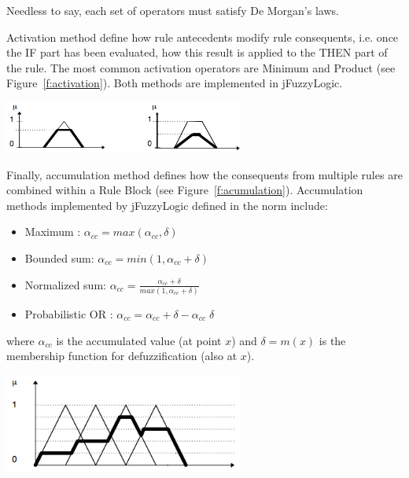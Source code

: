 \documentclass[11pt,twoside]{article}
\begin{document}
\begin{multicols}{2}
Needless to say, each set of operators must satisfy De Morgan’s laws.

Activation method define how rule antecedents modify rule consequents, i.e. once the IF part has been evaluated, how this result is applied to the THEN part of the rule.  
The most common activation operators are Minimum and Product (see Figure~\ref{f:activation}).
Both methods are implemented in jFuzzyLogic.

\vspace*{10pt}
\centerline{\includegraphics[width=3.1in]{./figs/MaxProd.png}}
\vspace*{10pt}
\label{f:activation}
\vspace*{10pt}

Finally, accumulation method defines how the consequents from multiple rules are combined within a Rule Block (see Figure~\ref{f:acumulation}).
Accumulation methods implemented by jFuzzyLogic defined in the norm include: 

\begin{itemize}
	\item Maximum : $\alpha_{cc} = max(\alpha_{cc}, \delta)$
	\item Bounded sum: $\alpha_{cc} = min(1, \alpha_{cc} + \delta)$
	\item Normalized sum: $\alpha_{cc} = \frac{\alpha_{cc} + \delta}{max(1, \alpha_{cc} + \delta)}$
	\item Probabilistic OR : $\alpha_{cc} =  \alpha_{cc} + \delta -  \alpha_{cc} \; \delta$
\end{itemize}

where $\alpha_{cc}$ is the accumulated value (at point $x$) and $\delta = m(x)$ is the membership function for defuzzification (also at $x$).

\vspace*{10pt}
\centerline{\includegraphics[width=3.1in]{./figs/accumulation.png}}
\vspace*{10pt}
\label{f:acumulation}
\vspace*{10pt}


\end{multicols}
\end{document}
